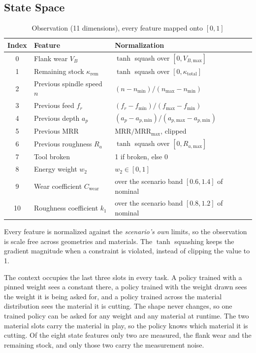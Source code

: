 \documentclass[11pt,a4paper]{article}
\newcommand{\MRR}{\mathrm{MRR}}
\newcommand{\Ra}{R_a}
\newcommand{\RaMax}{R_{a,\text{max}}}
\newcommand{\VB}{V_B}
\newcommand{\VBMax}{V_{B,\text{max}}}
\begin{document}
\subsection{State Space}
\label{sec:obs}
\begin{table}[H]
\centering
\caption{Observation (11 dimensions), every feature mapped onto $[0,1]$}
\label{tab:obs}
\begin{tabular}{@{}cll@{}}
\toprule
\textbf{Index} & \textbf{Feature} & \textbf{Normalization} \\
\midrule
0 & Flank wear $\VB$ & $\tanh$ squash over $[0, \VBMax]$ \\
1 & Remaining stock $\kappa_\text{rem}$ & $\tanh$ squash over $[0, \kappa_\text{total}]$ \\
2 & Previous spindle speed $n$ & $(n-n_\text{min})/(n_\text{max}-n_\text{min})$ \\
3 & Previous feed $f_r$ & $(f_r-f_\text{min})/(f_\text{max}-f_\text{min})$ \\
4 & Previous depth $a_p$ & $(a_p-a_{p,\text{min}})/(a_{p,\text{max}}-a_{p,\text{min}})$ \\
5 & Previous $\MRR$ & $\MRR / \MRR_\text{max}$, clipped \\
6 & Previous roughness $\Ra$ & $\tanh$ squash over $[0, \RaMax]$ \\
7 & Tool broken & 1 if broken, else 0 \\
8 & Energy weight $w_2$ & $w_2 \in [0,1]$ \\
9 & Wear coefficient $C_\text{wear}$ & over the scenario band $[0.6, 1.4]$ of nominal \\
10 & Roughness coefficient $k_1$ & over the scenario band $[0.8, 1.2]$ of nominal \\
\bottomrule
\end{tabular}
\end{table}

Every feature is normalized against the \emph{scenario's own} limits, so the observation is scale free across geometries and materials. The $\tanh$ squashing keeps the gradient magnitude when a constraint is violated, instead of clipping the value to 1.

The context occupies the last three slots in every task. A policy trained with a pinned weight sees a constant there, a policy trained with the weight drawn sees the weight it is being asked for, and a policy trained across the material distribution sees the material it is cutting. The shape never changes, so one trained policy can be asked for any weight and any material at runtime. The two material slots carry the material in play, so the policy knows which material it is cutting. Of the eight state features only two are measured, the flank wear and the remaining stock, and only those two carry the measurement noise.
\end{document}
